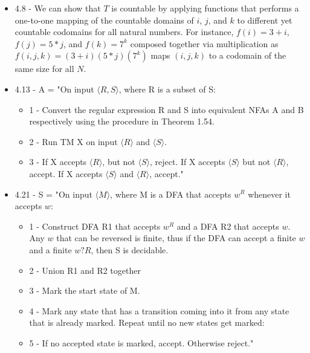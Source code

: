\documentclass{article}
\begin{document}
\begin{itemize}
  \item 4.8 - We can show that $T$ is countable by applying functions that performs a one-to-one mapping of the countable domains of $i$, $j$, and $k$ to different yet countable codomains for all natural numbers. For instance, $f(i) = 3 + i$, $f(j) = 5 * j$, and $f(k) = 7^{k}$ composed together via multiplication as $f(i,j,k) = (3 + i)(5 * j)(7^{k})$ maps $(i,j,k)$ to a codomain of the same size for all $N$.
  \item 4.13 - A = "On input $\langle R, S \rangle$, where R is a subset of S:
    \begin{itemize}
      \item 1 - Convert the regular expression R and S into equivalent NFAs A and B respectively using the procedure in Theorem 1.54.
      \item 2 - Run TM X on input $\langle R \rangle$ and $\langle S \rangle$.
      \item 3 - If X accepts $\langle R \rangle$, but not $\langle S \rangle$, reject. If X accepts $\langle S \rangle$ but not $\langle R \rangle$, accept. If X accepts $\langle S \rangle$ and $\langle R \rangle$, accept." 
    \end{itemize}
  \item 4.21 - S = "On input $\langle M \rangle$, where M is a DFA that accepts $w^{R}$ whenever it accepts $w$:
    \begin{itemize}
      \item 1 - Construct DFA R1 that accepts $w^{R}$ and a DFA R2 that accepts $w$. Any $w$ that can be reversed is finite, thus if the DFA can accept a finite $w$ and a finite $w?{R}$, then S is decidable.
      \item 2 - Union R1 and R2 together
      \item 3 - Mark the start state of M.
      \item 4 - Mark any state that has a transition coming into it from any state that is already marked. Repeat until no new states get marked:
      \item 5 - If no accepted state is marked, accept. Otherwise reject."
    \end{itemize}
\end{itemize}
\end{document}
